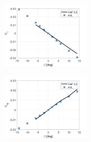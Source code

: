 \begin{figure}[H]
     \centering
     \begin{subfigure}[b]{0.45\textwidth}
            \centering
         \includegraphics[width=0.5\textwidth]{05_Results/Figs/VAP/genMAV/GenMAVModelValidation2.png}
         \label{fig:genMAV_Cl_roll}
         \caption{}

     \end{subfigure}
     \hfill
     \begin{subfigure}[b]{0.45\textwidth}
               \centering
         \includegraphics[width=0.5\textwidth]{05_Results/Figs/VAP/genMAV/GenMAVModelValidation3.png}
         \label{fig:genMAV_Cn}
         \caption{}
     \end{subfigure}
     \hfill
\end{figure}





       
